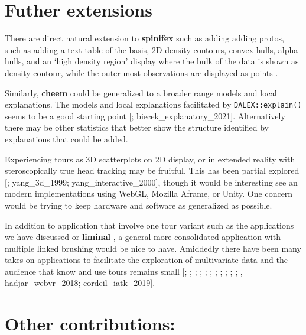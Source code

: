 \documentclass{template/monashthesis}
\begin{document}
\hypertarget{futher-extensions}{%
\section{Futher extensions}\label{futher-extensions}}

There are direct natural extension to \textbf{spinifex} such as adding adding protos, such as adding a text table of the basis, 2D density contours, convex hulls, alpha hulls, and an `high density region' display where the bulk of the data is shown as density contour, while the outer most observations are displayed as points \autocite{hyndman_computing_1996}.

Similarly, \textbf{cheem} could be generalized to a broader range models and local explanations. The models and local explanations facilitated by \texttt{DALEX::explain()} seems to be a good starting point {[}\textcite{biecek_dalex_2018}; biecek\_explanatory\_2021{]}. Alternatively there may be other statistics that better show the structure identified by explanations that could be added.

Experiencing tours as 3D scatterplots on 2D display, or in extended reality with steroscopically true head tracking may be fruitful. This has been partial explored {[}\textcite{nelson_xgobi_1998}; yang\_3d\_1999; yang\_interactive\_2000{]}, though it would be interesting see an modern implementations using WebGL, Mozilla Aframe, or Unity. One concern would be trying to keep hardware and software as generalized as possible.

In addition to application that involve one tour variant such as the applications we have discussed or \textbf{liminal} \autocite{lee_casting_2020}, a general more consolidated application with multiple linked brushing would be nice to have. Amiddedly there have been many takes on applications to facilitate the exploration of multivariate data and the audience that know and use tours remains small {[}\textcite{fisherkeller_prim-9:_1974}; \textcite{carr_explor4:_1988}; \textcite{tierney_lisp-stat:_1990}; \textcite{swayne_xgobi:_1991}; \textcite{hardle_xplore:_1995}; \textcite{carr_explorn:_1996}; \textcite{nelson_xgobi_1998}; \textcite{sutherland_orca:_2000}; \textcite{huh_davis:_2002}; \textcite{swayne_ggobi:_2003}; \textcite{wegman_visual_2003}; \textcite{jeong_ipca:_2009}, hadjar\_webvr\_2018; cordeil\_iatk\_2019{]}.

\hypertarget{other-contributions}{%
\section{Other contributions:}\label{other-contributions}}
\end{document}
